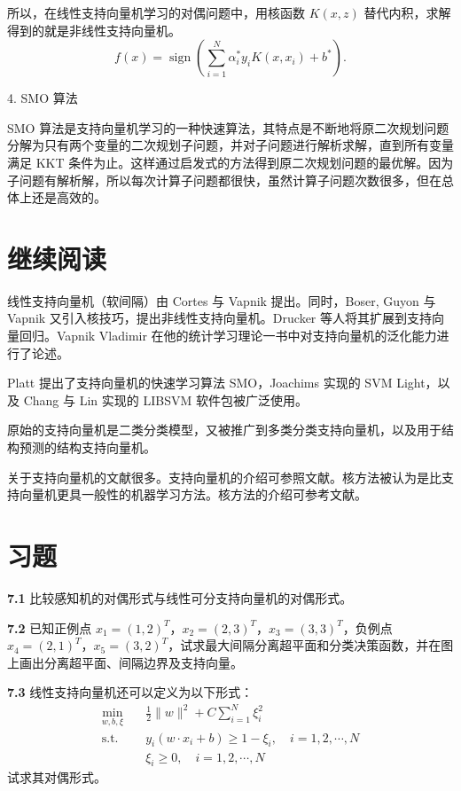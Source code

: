 \documentclass[UTF8,12pt,a4paper,fontset=fandol]{ctexart}
\begin{document}
所以，在线性支持向量机学习的对偶问题中，用核函数 $K(x,z)$ 替代内积，求解得到的就是非线性支持向量机。
\[
f(x)=\operatorname{sign}\left(\sum_{i=1}^N\alpha_i^*y_iK(x,x_i)+b^*\right).
\]

4. SMO 算法

SMO 算法是支持向量机学习的一种快速算法，其特点是不断地将原二次规划问题分解为只有两个变量的二次规划子问题，并对子问题进行解析求解，直到所有变量满足 KKT 条件为止。这样通过启发式的方法得到原二次规划问题的最优解。因为子问题有解析解，所以每次计算子问题都很快，虽然计算子问题次数很多，但在总体上还是高效的。

\section*{继续阅读}

线性支持向量机（软间隔）由 Cortes 与 Vapnik 提出。同时，Boser, Guyon 与 Vapnik 又引入核技巧，提出非线性支持向量机。Drucker 等人将其扩展到支持向量回归。Vapnik Vladimir 在他的统计学习理论一书中对支持向量机的泛化能力进行了论述。

Platt 提出了支持向量机的快速学习算法 SMO，Joachims 实现的 SVM Light，以及 Chang 与 Lin 实现的 LIBSVM 软件包被广泛使用。

原始的支持向量机是二类分类模型，又被推广到多类分类支持向量机，以及用于结构预测的结构支持向量机。

关于支持向量机的文献很多。支持向量机的介绍可参照文献。核方法被认为是比支持向量机更具一般性的机器学习方法。核方法的介绍可参考文献。

\section*{习题}

\noindent\textbf{7.1}\quad
比较感知机的对偶形式与线性可分支持向量机的对偶形式。

\noindent\textbf{7.2}\quad
已知正例点 $x_1=(1,2)^T$，$x_2=(2,3)^T$，$x_3=(3,3)^T$，负例点 $x_4=(2,1)^T$，$x_5=(3,2)^T$，试求最大间隔分离超平面和分类决策函数，并在图上画出分离超平面、间隔边界及支持向量。

\noindent\textbf{7.3}\quad
线性支持向量机还可以定义为以下形式：
\[
\begin{aligned}
\min_{w,b,\xi}\quad & \frac{1}{2}\|w\|^2+C\sum_{i=1}^N\xi_i^2\\
\mathrm{s.t.}\quad & y_i(w\cdot x_i+b)\geq 1-\xi_i,\quad i=1,2,\cdots,N\\
& \xi_i\geq 0,\quad i=1,2,\cdots,N
\end{aligned}
\]
试求其对偶形式。
\end{document}
